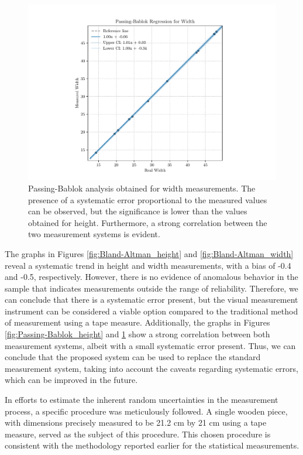 \begin{figure}
    \centering
    \includegraphics[width=0.75\linewidth]{images/chap5/Passing-Bablok_width.pdf}
    \caption{Passing-Bablok analysis obtained for width measurements. The presence of a systematic error proportional to the measured values can be observed, but the significance is lower than the values obtained for height. Furthermore, a strong correlation between the two measurement systems is evident.}
    \label{fig:Passing-Bablok_width}
\end{figure}


The graphs in Figures \ref{fig:Bland-Altman_height} and \ref{fig:Bland-Altman_width} reveal a systematic trend in height and width measurements, with a bias of -0.4 and -0.5, respectively. However, there is no evidence of anomalous behavior in the sample that indicates measurements outside the range of reliability. Therefore, we can conclude that there is a systematic error present, but the visual measurement instrument can be considered a viable option compared to the traditional method of measurement using a tape measure. Additionally, the graphs in Figures \ref{fig:Passing-Bablok_height} and \ref{fig:Passing-Bablok_width} show a strong correlation between both measurement systems, albeit with a small systematic error present. Thus, we can conclude that the proposed system can be used to replace the standard measurement system, taking into account the caveats regarding systematic errors, which can be improved in the future.


In efforts to estimate the inherent random uncertainties in the measurement process, a specific procedure was meticulously followed. A single wooden piece, with dimensions precisely measured to be 21.2 cm by 21 cm using a tape measure, served as the subject of this procedure. This chosen procedure is consistent with the methodology reported earlier for the statistical measurements. 

